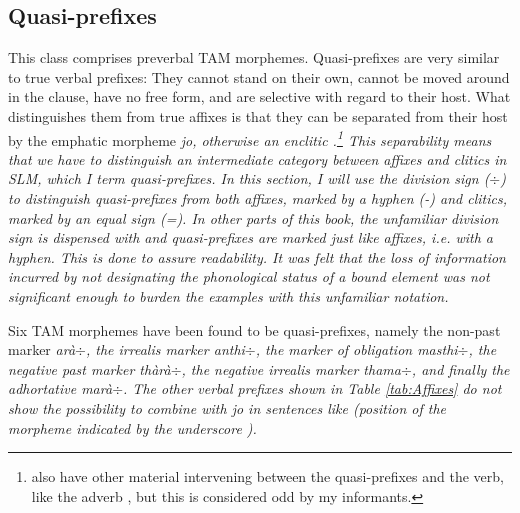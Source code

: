 \subsection{Quasi-prefixes}\label{sec:morph:Quasi-prefixes}
This class comprises  preverbal TAM morphemes. Quasi-prefixes are very similar to true verbal prefixes: They cannot stand on their own, cannot be moved around in the clause, have no free form, and are selective with regard to their host. What distinguishes them from true affixes is that they can be separated from their host by the emphatic morpheme \em jo\em, otherwise an enclitic \citep[cf.][164]{SmithEtAl2006cll}.\footnote{\citet{SmithEtAl2006cll} also have other material intervening between the quasi-prefixes and the verb, like the adverb , but this is considered odd by my informants.}
This separability means that we have to distinguish an intermediate category between affixes and clitics in SLM, which I term \em quasi-prefixes\em. In this section, I will use the division sign ($\div$) to distinguish quasi-prefixes from both affixes, marked by a hyphen (-) and clitics, marked by an equal sign (=). In other parts of this book, the unfamiliar division sign is dispensed with and quasi-prefixes are marked just like affixes, i.e. with a hyphen. This is done to assure readability. It was felt that the loss of information incurred by not designating the phonological status of a bound element was not significant enough to burden the examples with this unfamiliar notation.

Six TAM morphemes have been found to be quasi-prefixes, namely
the non-past marker \em arà$\div$\em,
the irrealis marker \em anthi$\div$, \em
the marker of obligation \em masthi$\div$, \em
the negative past marker \em thàrà$\div$, \em
the negative irrealis marker \em thama$\div$, \em
and finally the adhortative \em marà$\div$\em. The other verbal prefixes shown in Table \ref{tab:Affixes} do not show the possibility to combine with \em jo \em in sentences like  (position of the morpheme indicated by the underscore \underscore).





